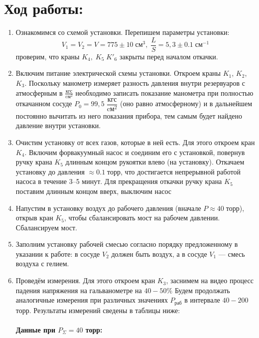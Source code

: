 \documentclass[a4paper,12pt]{article}
\begin{document}
\section{Ход работы:}
\begin{enumerate}
\itemsep0em
\item Ознакомимся со схемой установки. Перепишем параметры установки: 
$$V_1 = V_2 = V = 775 \pm 10 \; \text{см}^{3}, \; \frac{L}{S} = 5,3 \pm 0.1 \; 
\text{см}^{-1}$$ 
проверим, что краны $K_4,\; K_5 \; K'_6$ закрыты перед началом откачки. 
\item Включим питание электрической схемы установки. Откроем краны $K_1$, $K_2$, $K_3$.
Поскольку манометр измеряет разность давления внутри резервуаров с атмосферным в $\frac{\text{кгс}}{\text{cм}^2}$ необходимо записать показание манометра при полностью откачанном сосуде $P_0 = 99,5 \;\dfrac{\text{кгс}}{\text{cм}^2}$ (оно равно атмосферному) и в дальнейшем постоянно вычитать из него показания прибора, тем самым будет найдено давление внутри установки.
\item Очистим установку от всех газов, которые в ней есть. Для этого откроем кран $K_4$. Включим форвакуумный насос  и соединим его с установкой, повернув ручку крана $K_5$ длинным концом рукоятки влево (на установку). Откачаем установку до давления $\approx 0.1 \; \text{торр} $, что достигается непрерывной работой насоса в течение 3–5 минут. Для прекращения откачки ручку крана $K_5$ поставим длинным концом вверх, выключим насос
\item  Напустим в установку воздух до рабочего давления (вначале $P \approx 40 \; \text{торр}$), открыв кран $K_5$, чтобы сбалансировать мост на рабочем давлении. Сбалансируем мост.
\item Заполним установку рабочей смесью согласно порядку предложенному в указании к работе: в сосуде $V_2$ должен быть воздух, а в сосуде $V_1$ — смесь воздуха с гелием.
\item Проведём измерения. Для этого откроем кран $K_3$, заснимем на видео процесс падения напряжения на гальванометре на $40 - 50\%$ Будем продолжать аналогичные измерения при различных значениях $P_\text{раб}$ в интервале $40 - 200$ торр. Результаты измерений сведены в таблицы ниже:
\paragraph{Данные при $P_{\Sigma} = 40$ торр:}


\end{enumerate}
\end{document}
